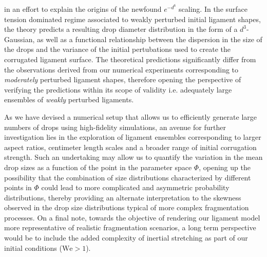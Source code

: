 in an effort to explain the origins of the newfound $e^{-d^6}$ scaling.
In the surface tension dominated regime associated to weakly perturbed initial ligament shapes, 
the theory predicts a resulting drop diameter distribution in the form of a $d^3$- Gaussian, 
as well as a functional relationship between the dispersion in the size of the drops and the 
variance of the initial pertubations used to create the corrugated ligament surface. 
The theoretical predictions significantly differ from the observations derived from our numerical experiments
corresponding to \textit{moderately} perturbed ligament shapes, therefore opening the perspective
of verifying the predictions within its scope of validity i.e. adequately large ensembles of \textit{weakly} perturbed ligaments.

As we have devised a numerical setup that allows us to efficiently generate
large numbers of drops using high-fidelity simulations, an avenue for further investigation
lies in the exploration of ligament ensembles corresponding to 
larger aspect ratios, centimeter length scales and a broader range of initial corrugation strength. 
Such an undertaking may allow us to quantify the variation in the mean drop sizes as a function of the 
point in the parameter space $\Phi$, opening up the possibility that the combination of size distributions
characterized by different points in $\Phi$ could lead to more complicated and asymmetric probability
distributions, thereby providing an alternate interpretation to the skewness observed in the drop size 
distributions typical of more complex fragmentation processes. 
On a final note, towards the objective of rendering our ligament model more representative of  
realistic fragmentation scenarios, a long term perspective would be to include the added complexity
of inertial stretching as part of our initial conditions ($\textrm{We} > 1$).  
